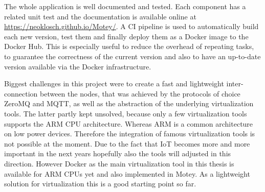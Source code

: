 The whole application is well documented and tested.
Each component has a related unit test and the documentation is available online at \url{https://neoklosch.github.io/Motey/}.
A \ac{CI} pipeline is used to automatically build each new version, test them and finally deploy them as a Docker image to the Docker Hub.
This is especially useful to reduce the overhead of repeating tasks, to guarantee the correctness of the current version and also to have an up-to-date version available via the Docker infrastructure.

Biggest challenges in this project were to create a fast and lightweight inter-connection between the nodes, that was achieved by the protocols of choice ZeroMQ and \ac{MQTT}, as well as the abstraction of the underlying virtualization tools.
The latter partly kept unsolved, because only a few virtualization tools supports the ARM \ac{CPU} architecture.
Whereas ARM is a common architecture on low power devices.
Therefore the integration of famous virtualization tools is not possible at the moment.
Due to the fact that \ac{IoT} becomes more and more important in the next years hopefully also the tools will adjusted in this direction.
However Docker as the main virtualization tool in this thesis is available for ARM \acp{CPU} yet and also implemented in Motey.
As a lightweight solution for virtualization this is a good starting point so far.


%
%





